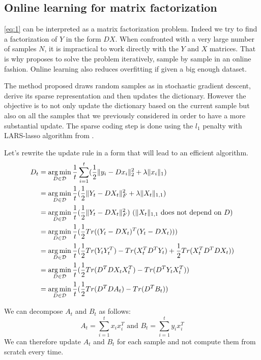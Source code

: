 \documentclass[a4paper,11pt]{article}
\DeclarePairedDelimiter\norm{\lVert}{\rVert} %
\DeclareMathOperator*{\argmin}{arg\,min} %
\begin{document}
\subsection{Online learning for matrix factorization}
\ref{eq:1} can be interpreted as a matrix factorization problem. Indeed we try to find a factorization of $Y$ in the form $DX$.
When confronted with a very large number of samples $N$, it is impractical to work directly with the $Y$ and $X$ matrices. That is why \cite{mairal10} proposes to solve the problem iteratively, sample by sample in an online fashion. Online learning also reduces overfitting if given a big enough dataset.

The method proposed draws random samples as in stochastic gradient descent, derive its sparse representation and then updates the dictionary.
However the objective is to not only update the dictionary based on the current sample but also on all the samples that we previously considered in order to have a more substantial update.
The sparse coding step is done using the $l_1$ penalty with LARS-lasso algorithm from \cite{efron04}.

Let's rewrite the update rule in a form that will lead to an efficient algorithm.
\begin{equation*}
\begin{split}
  D_t & = \argmin_{D \in \mathcal{D}} \frac{1}{t} \sum\limits_{i=1}^t (\frac{1}{2} \norm{y_i - D x_i}_2^2 + \lambda \norm{x_i}_1)\\
      & = \argmin_{D \in \mathcal{D}} \frac{1}{t}  (\frac{1}{2} \norm{Y_t - DX_t}_F^2 + \lambda \norm{X_t}_{1,1})\\
      & = \argmin_{D \in \mathcal{D}} \frac{1}{t}  (\frac{1}{2} \norm{Y_t - DX_t}_F^2) \text{   ($\norm{X_t}_{1,1}$ does not depend on $D$)}\\
      & = \argmin_{D \in \mathcal{D}} \frac{1}{t}  (\frac{1}{2} Tr((Y_t - DX_t)^T (Y_t - DX_t)))\\
      & = \argmin_{D \in \mathcal{D}} \frac{1}{t}  (\frac{1}{2} Tr(Y_t Y_t^T) - Tr(X_t^T D^T Y_t) + \frac{1}{2} Tr(X_t^T D^T D X_t))\\
      & = \argmin_{D \in \mathcal{D}} \frac{1}{t}  (\frac{1}{2} Tr(D^T D X_t X_t^T) - Tr(D^T Y_t X_t^T) )\\
      & = \argmin_{D \in \mathcal{D}} \frac{1}{t}  (\frac{1}{2} Tr(D^T D A_t) - Tr(D^T B_t) )
\end{split}
\end{equation*}

We can decompose $A_t$ and $B_t$ as follows:
$$ A_t = \sum\limits_{i=1}^t x_i x_i^T \text{ and } B_t = \sum\limits_{i=1}^t y_i x_i^T $$
We can therefore update $A_t$ and $B_t$ for each sample and not compute them from scratch every time.
\end{document}
